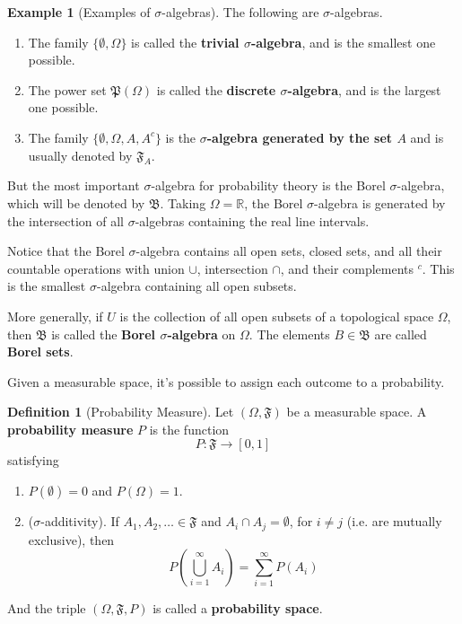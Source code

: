 \documentclass[12pt,a4paper]{article}
\theoremstyle{definition}
\newtheorem{example}{Example}[section]
\newtheorem{definition}{Definition}[section]
\begin{document}
\begin{example}[Examples of $\sigma$-algebras]
	The following are $\sigma$-algebras.
	\begin{enumerate}
		\item The family $\{\emptyset, \Omega\}$ is called the \textbf{trivial $\sigma$-algebra}, and is the smallest one possible.
		\item The power set $\mathfrak{P}(\Omega)$ is called the \textbf{discrete $\sigma$-algebra}, and is the largest one possible.
		\item The family $\{\emptyset, \Omega, A, A^c\}$ is the \textbf{$\sigma$-algebra generated by the set $A$} and is usually denoted by $\mathfrak{F}_A$.
	\end{enumerate}
\end{example}

But the most important $\sigma$-algebra for probability theory is the Borel $\sigma$-algebra, which will be denoted by $\mathfrak{B}$. Taking $\Omega = \mathbb{R}$, the Borel $\sigma$-algebra is generated by the intersection of all $\sigma$-algebras containing the real line intervals.

Notice that the Borel $\sigma$-algebra contains all open sets, closed sets, and all their countable operations with union $\cup$, intersection $\cap$, and their complements $^c$. This is the smallest $\sigma$-algebra containing all open subsets.

More generally, if $U$ is the collection of all open subsets of a topological space $\Omega$, then $\mathfrak{B}$ is called the \textbf{Borel $\sigma$-algebra} on $\Omega$. The elements $B \in \mathfrak{B}$ are called \textbf{Borel sets}.

Given a measurable space, it's possible to assign each outcome to a probability.

\begin{definition}[Probability Measure]
	Let $(\Omega, \mathfrak{F})$ be a measurable space. A \textbf{probability measure} $P$ is the function
	\[
		P : \mathfrak{F} \longrightarrow [0,1]
	\]
	satisfying
	\begin{enumerate}
		\item $P(\emptyset) = 0$ and $P(\Omega) = 1$.
		\item ($\sigma$-additivity). If $A_1, A_2, \ldots \in \mathfrak{F}$ and $A_i \cap A_j = \emptyset$, for $i \neq j$ (i.e. are mutually exclusive), then \[ P \left( \bigcup_{i=1}^\infty A_i \right) = \sum_{i=1}^\infty P(A_i)\]
	\end{enumerate}
	
	And the triple $(\Omega, \mathfrak{F}, P)$ is called a \textbf{probability space}.
\end{definition}
\end{document}
